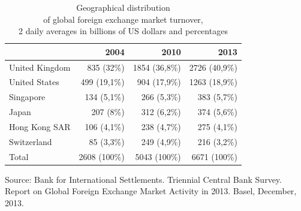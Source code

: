 \documentclass[international_finance_p1.tex]{subfiles}
\begin{document}
\begin{frame}[shrink=15]
\begin{table}[htbp]
  \centering
  \fontsize{10pt}{10pt}\selectfont  
  \caption{Geographical distribution\\of global foreign exchange market turnover,\\2 daily averages in billions of US dollars and percentages}
\begin{tabularx}{\linewidth}[b]{@{}>{\raggedright\arraybackslash}Xrrr@{}}
	\toprule
	               & 2004         & 2010          & 2013          \\ \midrule
	United Kingdom & 835 (32\%)   & 1854 (36,8\%) & 2726 (40,9\%) \\
	United States  & 499 (19,1\%) & 904 (17,9\%)  & 1263 (18,9\%) \\
	Singapore      & 134 (5,1\%)  & 266 (5,3\%)   & 383 (5,7\%)   \\
	Japan          & 207 (8\%)    & 312 (6,2\%)   & 374 (5,6\%)   \\
	Hong Kong SAR  & 106 (4,1\%)  & 238 (4,7\%)   & 275 (4,1\%)   \\
	Switzerland    & 85 (3,3\%)   & 249 (4,9\%)   & 216 (3,2\%)   \\ \midrule
	Total          & 2608 (100\%) & 5043 (100\%)  & 6671 (100\%)  \\ \bottomrule
\end{tabularx}%
  \label{tab:addlabel}%

\raggedright
\small{Source: Bank for International Settlements. Triennial Central Bank Survey. Report on Global Foreign Exchange Market Activity in 2013. Basel, December, 2013.}
\end{table}%
\end{frame}
\end{document}
